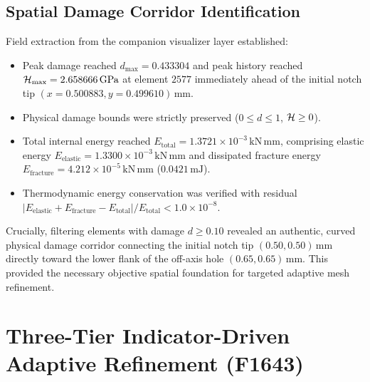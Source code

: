 \subsection{Spatial Damage Corridor Identification}
\label{subsec:pilot_corridor}

Field extraction from the companion visualizer layer established:
\begin{itemize}
  \item Peak damage reached $d_{\max} = 0.433304$ and peak history reached $\mathcal{H}_{\max} = 2.658666\,\mathrm{GPa}$ at element $2577$ immediately ahead of the initial notch tip $(x=0.500883, y=0.499610)\,\mathrm{mm}$.
  \item Physical damage bounds were strictly preserved ($0 \le d \le 1$, $\mathcal{H} \ge 0$).
  \item Total internal energy reached $E_{\mathrm{total}} = 1.3721 \times 10^{-3}\,\mathrm{kN\,mm}$, comprising elastic energy $E_{\mathrm{elastic}} = 1.3300 \times 10^{-3}\,\mathrm{kN\,mm}$ and dissipated fracture energy $E_{\mathrm{fracture}} = 4.212 \times 10^{-5}\,\mathrm{kN\,mm}$ ($0.0421\,\mathrm{mJ}$).
  \item Thermodynamic energy conservation was verified with residual $|E_{\mathrm{elastic}} + E_{\mathrm{fracture}} - E_{\mathrm{total}}| / E_{\mathrm{total}} < 1.0 \times 10^{-8}$.
\end{itemize}

Crucially, filtering elements with damage $d \ge 0.10$ revealed an authentic, curved physical damage corridor connecting the initial notch tip $(0.50, 0.50)\,\mathrm{mm}$ directly toward the lower flank of the off-axis hole $(0.65, 0.65)\,\mathrm{mm}$. This provided the necessary objective spatial foundation for targeted adaptive mesh refinement.

\section{Three-Tier Indicator-Driven Adaptive Refinement (F1643)}
\label{sec:hole_adaptive_mesh}


